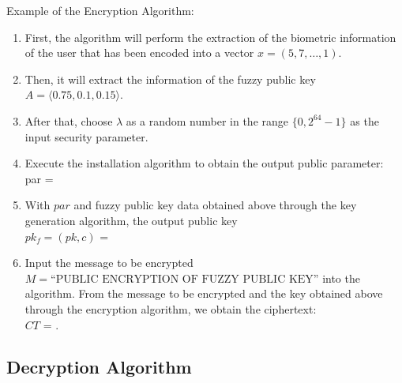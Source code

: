 \documentclass[graybox]{svmult}
\begin{document}
Example of the Encryption Algorithm:
\begin{enumerate}
    \item First, the algorithm will perform the extraction of the biometric information of the user that has been encoded into a vector $x = (5, 7, \dots, 1)$.
    \item Then, it will extract the information of the fuzzy public key $A = \langle 0.75, 0.1, 0.15 \rangle$.
    \item After that, choose $\lambda$ as a random number in the range $\{0, 2^{64} - 1\}$ as the input security parameter.
    \item Execute the installation algorithm to obtain the output public parameter:\\
    par = 
 

    \item With $par$ and fuzzy public key data obtained above through the key generation algorithm, the output public key \\ $pk_f = (pk, c)$ =

    \item Input the message to be encrypted \\ $M = \text{``PUBLIC ENCRYPTION OF FUZZY PUBLIC KEY''}$ into the algorithm. From the message to be encrypted and the key obtained above through the encryption algorithm, we obtain the ciphertext:\\ $CT$
    =  .
\end{enumerate}

\subsection{Decryption Algorithm}
\end{document}
